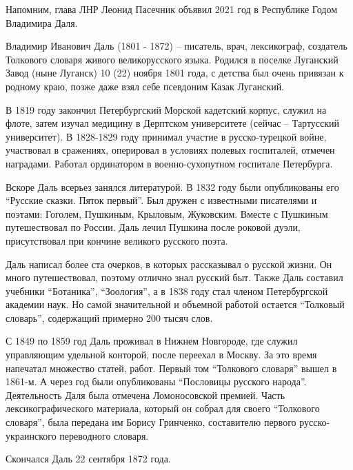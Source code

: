 Напомним, глава ЛНР Леонид Пасечник объявил 2021 год в Республике Годом
Владимира Даля.

Владимир Иванович Даль (1801 - 1872) – писатель, врач, лексикограф, создатель
Толкового словаря живого великорусского языка. Родился в поселке Луганский
Завод (ныне Луганск) 10 (22) ноября 1801 года, с детства был очень привязан к
родному краю, позже даже взял себе псевдоним Казак Луганский.

В 1819 году закончил Петербургский Морской кадетский корпус, служил на флоте,
затем изучал медицину в Дерптском университете (сейчас – Тартусский
университет). В 1828-1829 году принимал участие в русско-турецкой войне,
участвовал в сражениях, оперировал в условиях полевых госпиталей, отмечен
наградами. Работал ординатором в военно-сухопутном госпитале Петербурга.

Вскоре Даль всерьез занялся литературой. В 1832 году были опубликованы его
\enquote{Русские сказки. Пяток первый}. Был дружен с известными писателями и поэтами:
Гоголем, Пушкиным, Крыловым, Жуковским. Вместе с Пушкиным путешествовал по
России. Даль лечил Пушкина после роковой дуэли, присутствовал при кончине
великого русского поэта.

Даль написал более ста очерков, в которых рассказывал о русской жизни. Он много
путешествовал, поэтому отлично знал русский быт. Также Даль составил учебники
\enquote{Ботаника}, \enquote{Зоология}, а в 1838 году стал членом Петербургской
академии наук.  Но самой значительной и объемной работой остается
\enquote{Толковый словарь}, содержащий примерно 200 тысяч слов.

С 1849 по 1859 год Даль проживал в Нижнем Новгороде, где служил управляющим
удельной конторой, после переехал в Москву. За это время напечатал множество
статей, работ. Первый том \enquote{Толкового словаря} вышел в 1861-м. А через год были
опубликованы \enquote{Пословицы русского народа}. Деятельность Даля была отмечена
Ломоносовской премией. Часть лексикографического материала, который он собрал
для своего \enquote{Толкового словаря}, была передана им Борису Гринченко, составителю
первого русско-украинского переводного словаря.

Скончался Даль 22 сентября 1872 года.
